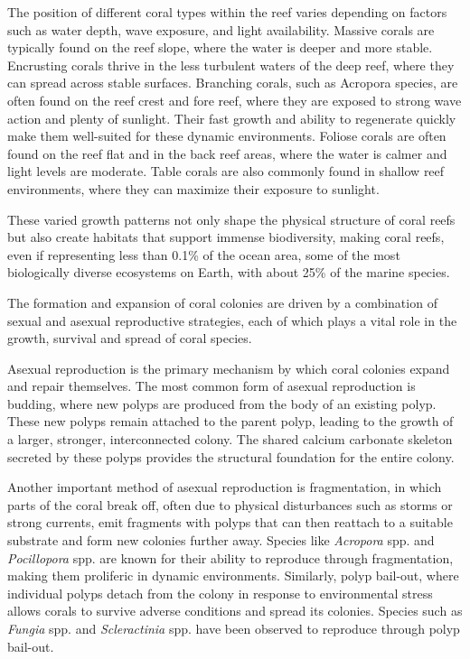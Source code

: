 The position of different coral types within the reef varies depending on factors such as water depth, wave exposure, and light availability. Massive corals are typically found on the reef slope, where the water is deeper and more stable. Encrusting corals thrive in the less turbulent waters of the deep reef, where they can spread across stable surfaces. Branching corals, such as Acropora species, are often found on the reef crest and fore reef, where they are exposed to strong wave action and plenty of sunlight. Their fast growth and ability to regenerate quickly make them well-suited for these dynamic environments. Foliose corals are often found on the reef flat and in the back reef areas, where the water is calmer and light levels are moderate. Table corals are also commonly found in shallow reef environments, where they can maximize their exposure to sunlight.

These varied growth patterns not only shape the physical structure of coral reefs but also create habitats that support immense biodiversity, making coral reefs, even if representing less than 0.1\% of the ocean area, some of the most biologically diverse ecosystems on Earth, with about 25\% of the marine species.

The formation and expansion of coral colonies are driven by a combination of sexual and asexual reproductive strategies, each of which plays a vital role in the growth, survival and spread of coral species.

Asexual reproduction is the primary mechanism by which coral colonies expand and repair themselves. The most common form of asexual reproduction is budding, where new polyps are produced from the body of an existing polyp. These new polyps remain attached to the parent polyp, leading to the growth of a larger, stronger, interconnected colony. The shared calcium carbonate skeleton secreted by these polyps provides the structural foundation for the entire colony.

Another important method of asexual reproduction is fragmentation, in which parts of the coral break off, often due to physical disturbances such as storms or strong currents, emit fragments with polyps that can then reattach to a suitable substrate and form new colonies further away. Species like \textit{Acropora} spp. and \textit{Pocillopora} spp. are known for their ability to reproduce through fragmentation, making them proliferic in dynamic environments. Similarly, polyp bail-out, where individual polyps detach from the colony in response to environmental stress allows corals to survive adverse conditions and spread its colonies. Species such as \textit{Fungia} spp. and \textit{Scleractinia} spp. have been observed to reproduce through polyp bail-out.

